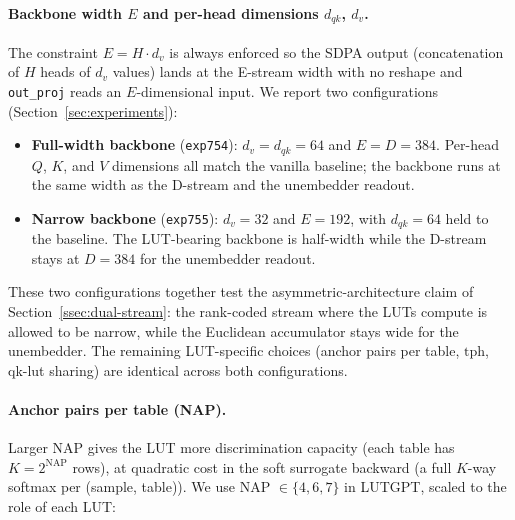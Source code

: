 \documentclass[11pt]{article}
\newcommand{\dqk}{d_{qk}}
\newcommand{\dv}{d_v}
\begin{document}
\paragraph{Backbone width $E$ and per-head dimensions $\dqk$, $\dv$.} The constraint $E = H \cdot \dv$ is always enforced so the SDPA output (concatenation of $H$ heads of $\dv$ values) lands at the E-stream width with no reshape and \texttt{out\_proj} reads an $E$-dimensional input. We report two configurations (Section~\ref{sec:experiments}):
\begin{itemize}[leftmargin=*,topsep=2pt,itemsep=1pt]
\item \textbf{Full-width backbone} (\texttt{exp754}): $\dv = \dqk = 64$ and $E = D = 384$. Per-head $Q$, $K$, and $V$ dimensions all match the vanilla baseline; the backbone runs at the same width as the D-stream and the unembedder readout.
\item \textbf{Narrow backbone} (\texttt{exp755}): $\dv = 32$ and $E = 192$, with $\dqk = 64$ held to the baseline. The LUT-bearing backbone is half-width while the D-stream stays at $D = 384$ for the unembedder readout.
\end{itemize}

These two configurations together test the asymmetric-architecture claim of Section~\ref{ssec:dual-stream}: the rank-coded stream where the LUTs compute is allowed to be narrow, while the Euclidean accumulator stays wide for the unembedder. The remaining LUT-specific choices (anchor pairs per table, $\mathrm{tph}$, qk-lut sharing) are identical across both configurations.

\paragraph{Anchor pairs per table (NAP).} Larger NAP gives the LUT more discrimination capacity (each table has $K = 2^{\mathrm{NAP}}$ rows), at quadratic cost in the soft surrogate backward (a full $K$-way softmax per (sample, table)). We use NAP $\in \{4, 6, 7\}$ in LUTGPT, scaled to the role of each LUT:
\end{document}
